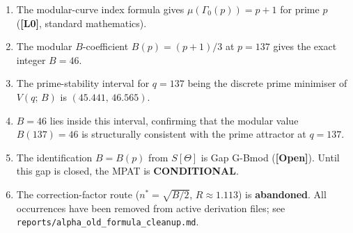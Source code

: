 \documentclass[12pt,a4paper]{article}
\theoremstyle{definition}
\theoremstyle{remark}
\newcommand{\OPEN}{\textbf{[Open]}}
\newcommand{\Lzero}{\textbf{[L0]}}
\begin{document}
\begin{enumerate}
  \item The modular-curve index formula gives $\mu(\Gamma_0(p)) = p + 1$ for
        prime $p$ (\Lzero, standard mathematics).

  \item The modular $B$-coefficient $B(p) = (p+1)/3$ at $p = 137$ gives the
        exact integer $B = 46$.

  \item The prime-stability interval for $q = 137$ being the discrete prime
        minimiser of $V(q;\,B)$ is $(45.441,\,46.565)$.

  \item $B = 46$ lies inside this interval, confirming that the modular value
        $B(137) = 46$ is structurally consistent with the prime attractor at
        $q = 137$.

  \item The identification $B = B(p)$ from $S[\Theta]$ is Gap G-Bmod (\OPEN).
        Until this gap is closed, the MPAT is \textbf{CONDITIONAL}.

  \item The correction-factor route ($n^* = \sqrt{B/2}$, $R \approx 1.113$)
        is \textbf{abandoned}.  All occurrences have been removed from active
        derivation files; see \texttt{reports/alpha\_old\_formula\_cleanup.md}.
\end{enumerate}

\ifdefined\INCLUDEMODE
\else
  
\end{document}
